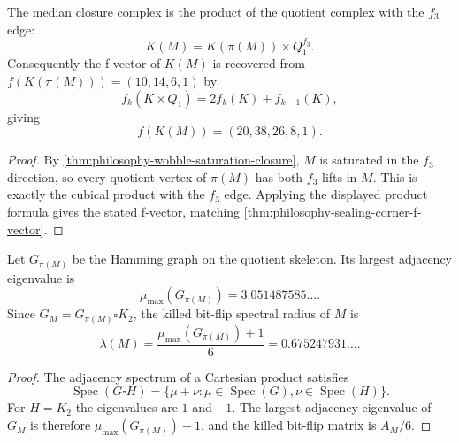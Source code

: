 \begin{theorem}
\label{thm:philosophy-wobble-product-decomposition}
The median closure complex is the product of the quotient complex with
the $f_{3}$ edge:
$$
  K(M)=K(\pi(M))\times Q_{1}^{f_{3}}.
$$
Consequently the f-vector of $K(M)$ is recovered from
$f(K(\pi(M)))=(10,14,6,1)$ by
$$
  f_{k}(K\times Q_{1})=2f_{k}(K)+f_{k-1}(K),
$$
giving
$$
  f(K(M))=(20,38,26,8,1).
$$
\end{theorem}
\begin{proof}
By \autoref{thm:philosophy-wobble-saturation-closure}, $M$ is saturated
in the $f_{3}$ direction, so every quotient vertex of $\pi(M)$ has both
$f_{3}$ lifts in $M$. This is exactly the cubical product with the
$f_{3}$ edge. Applying the displayed product formula gives the stated
f-vector, matching \autoref{thm:philosophy-sealing-corner-f-vector}.
\end{proof}

\begin{theorem}
\label{thm:philosophy-quotient-spectral-reconstruction}
Let $G_{\pi(M)}$ be the Hamming graph on the quotient skeleton. Its
largest adjacency eigenvalue is
$$
  \mu_{\max}(G_{\pi(M)})=3.051487585\ldots.
$$
Since $G_{M}=G_{\pi(M)}\square K_{2}$, the killed bit-flip spectral
radius of $M$ is
$$
  \lambda(M)
  =
  \frac{\mu_{\max}(G_{\pi(M)})+1}{6}
  =
  0.675247931\ldots.
$$
\end{theorem}
\begin{proof}
The adjacency spectrum of a Cartesian product satisfies
$$
  \operatorname{Spec}(G\square H)
  =
  \{\mu+\nu:\mu\in\operatorname{Spec}(G),\nu\in\operatorname{Spec}(H)\}.
$$
For $H=K_{2}$ the eigenvalues are $1$ and $-1$. The largest adjacency
eigenvalue of $G_{M}$ is therefore $\mu_{\max}(G_{\pi(M)})+1$, and the
killed bit-flip matrix is $A_{M}/6$.
\end{proof}

